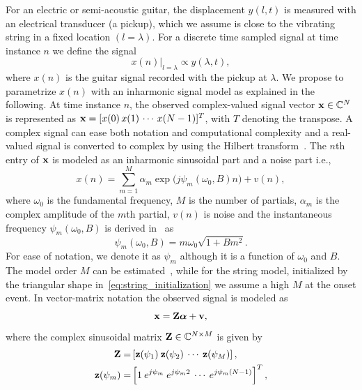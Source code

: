 \documentclass{article}
\begin{document}
For an electric or semi-acoustic guitar, the displacement $y(l,t)$ is measured with an electrical transducer (a pickup), which we assume is close to the vibrating string in a fixed location $(l=\lambda)$. For a discrete time sampled signal at time instance $n$ we define the signal
\begin{equation}
     x(n)  \vert_{l=\lambda} \propto y(\lambda, t),
\end{equation}   
where $x(n)$ is the guitar signal recorded with the pickup at $\lambda$. We propose to parametrize $x(n)$ with an inharmonic signal model as explained in the following. 
%
 At time instance $n$, the observed complex-valued signal vector $\mathbf x \in \mathbb{C}^N$ is represented as $\mathbf x = [x(0) \, x(1) \, \cdots \, x(N-1)]^T$, with $T$ denoting the transpose. %
A complex signal can ease both notation and computational complexity and a real-valued signal is converted to complex by using the Hilbert transform~\cite{LawrenceMarple1999}. The $n$th entry of $\mathbf x$ is modeled as an inharmonic sinusoidal part and a noise part i.e.,  
\begin{equation}\label{eq:sigmod1}
  x(n)\! =  \!\sum\limits_{m=1}^{M}\!\! \alpha_{m} \exp\big({j\psi_m(\omega_0,B) n}\big)+v(n), 
\end{equation}
where $\omega_0$ is the fundamental frequency, $M$ is the number of partials, $\alpha_{m}$ is the complex amplitude of the $m$th partial, $v(n)$ is noise and the instantaneous frequency  $\psi_m(\omega_0,B)$ is derived in~\cite{fletcher:piano_model} as
\begin{equation}
  \psi_m(\omega_0,B) = m \omega_0 \sqrt{1+B m^2}. 
\end{equation}
For ease of notation, we denote it as $\psi_m$ although it is a function of $\omega_0$ and $B$. The model order $M$ can be estimated~\cite{nielsen2017fast,multipitch}, while for the string model, initialized by the triangular shape in~\eqref{eq:string_initialization} we assume a high $M$ at the onset event. In vector-matrix notation the observed signal is modeled as
\begin{equation}\label{eq:xZa}
  \mathbf x = \mathbf{Z} \text{\boldmath$\alpha$} + \mathbf v,
\end{equation} 
where the complex sinusoidal matrix $\mathbf{Z} \in \mathbb{C}^{N\times M}$ is given by
\begin{align}
  \mathbf{Z} =& \left[ \mathbf z(\psi_1) \: \mathbf z(\psi_2) \: \cdots \: \mathbf z(\psi_M)\right], \\
  \mathbf z(\psi_m) =& \left[ 1 \: e^{j\psi_m} \: e^{j\psi_m2} \: \cdots \: e^{j\psi_m(N-1)} \right]^{T},
\end{align}
\end{document}
